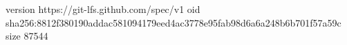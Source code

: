 version https://git-lfs.github.com/spec/v1
oid sha256:8812f380190addac581094179eed4ac3778e95fab98d6a6a248b6b701f57a59c
size 87544
